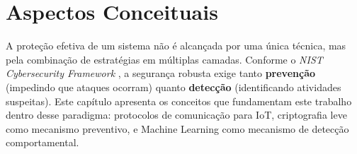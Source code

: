 \chapter{Aspectos Conceituais} \label{cap:conceitos}


A proteção efetiva de um sistema não é alcançada por uma única técnica, 
mas pela combinação de estratégias em múltiplas camadas. Conforme o 
\textit{NIST Cybersecurity Framework} \cite{nist_csf_2024}, a segurança 
robusta exige tanto \textbf{prevenção} (impedindo que ataques ocorram) 
quanto \textbf{detecção} (identificando atividades suspeitas). Este 
capítulo apresenta os conceitos que fundamentam este trabalho dentro 
desse paradigma: protocolos de comunicação para IoT, criptografia leve 
como mecanismo preventivo, e Machine Learning como mecanismo de detecção 
comportamental.







